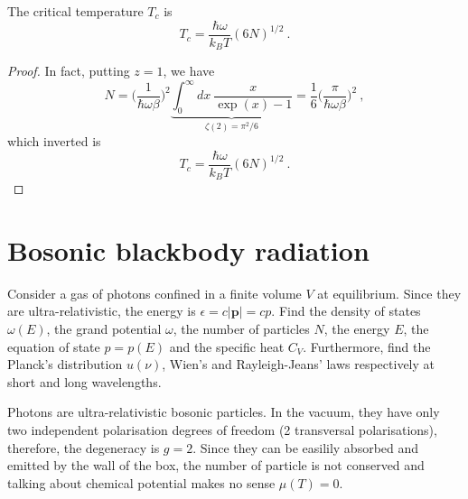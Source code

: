     The critical temperature $T_c$ is 
    \begin{equation*}
            T_c = \frac{\hbar \omega}{k_B T} (6N)^{1/2} ~.
    \end{equation*}
    \begin{proof}
        In fact, putting $z = 1$, we have 
        \begin{equation}
            N = \Big (\frac{1}{\hbar \omega \beta} \Big )^{2} \underbrace{\int_0^\infty d x ~ \frac{x}{\exp (x) - 1} }_{\zeta(2) = \pi^2 / 6} = \frac{1}{6} \Big (\frac{\pi}{\hbar \omega \beta} \Big )^{2} ~,
        \end{equation}
        which inverted is 
        \begin{equation}
            T_c = \frac{\hbar \omega}{k_B T} (6N)^{1/2} ~.
        \end{equation}
    \end{proof}

\section{Bosonic blackbody radiation}

    \begin{exercise}
        Consider a gas of photons confined in a finite volume $V$ at equilibrium. Since they are ultra-relativistic, the energy is $\epsilon = c |\mathbf p| = cp$. 
        Find the density of states $\omega(E)$, the grand potential $\omega$, the number of particles $N$, the energy $E$, the equation of state $p = p(E)$ and the specific heat $C_V$. Furthermore, find the Planck's distribution $u(\nu)$, Wien's and Rayleigh-Jeans' laws respectively at short and long  wavelengths.
    \end{exercise}

    Photons are ultra-relativistic bosonic particles. In the vacuum, they have only two independent polarisation degrees of freedom (2 transversal polarisations), therefore, the degeneracy is $g=2$. Since they can be easilily absorbed and emitted by the wall of the box, the number of particle is not conserved and talking about chemical potential makes no sense $\mu (T) = 0$. 


